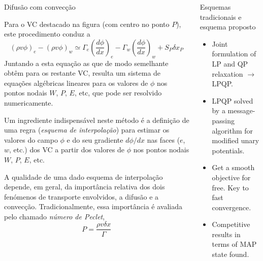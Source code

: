 \documentclass[final,t]{beamer}
\begin{document}
\begin{frame}{}
\begin{columns}[t]
\begin{column}{0.488\linewidth}
\begin{block}{Difusão com convecção}
{

        }
        Para o VC destacado na figura (com centro no ponto $P$),
        este procedimento conduz a
        \begin{equation*}
            (\rho v \phi)_e - (\rho v \phi)_w \simeq
            \Gamma_e\left(\frac{d\phi}{dx}\right)_e-
            \Gamma_w\left(\frac{d\phi}{dx}\right)_w + S_P\delta x_P
        \end{equation*}
        Juntando a esta equação as que de modo semelhante obtêm para os restante
        VC, resulta um sistema de equações algébricas lineares para os valores
        de $\phi$ nos pontos nodais $W$, $P$, $E$, etc, que pode ser resolvido
        numericamente.

        \vspace{5mm}
        Um ingrediente indispensável neste método é a definição de uma regra
        (\emph{esquema de interpolação}) para estimar os valores do campo $\phi$
        e do seu gradiente $d\phi/dx$ nas faces ($e$, $w$, etc.) dos VC a partir
        dos valores de $\phi$ nos pontos nodais $W$, $P$, $E$, etc.

        \vspace{5mm}
        A qualidade de uma dado esquema de interpolação depende, em geral, da
        importância relativa dos dois fenómenos de transporte envolvidos, a
        difusão e a convecção. Tradicionalmente, essa importância é avaliada
        pelo chamado \emph{número de Peclet},
        \begin{equation*}
            P=\frac{\rho v \delta x}{\Gamma}
        \end{equation*}
    \end{block}

\end{column}


\hfill
\begin{column}{.488\linewidth}
  
    \begin{block}{Esquemas tradicionais e esquema proposto}
        \begin{itemize}
            \item Joint formulation of LP and QP relaxation $\rightarrow$ LPQP.
            \item LPQP solved by a message-passing
            algorithm for modified unary potentials.
            \item Get a smooth objective for free. Key to fast convergence.
            \item Competitive results in terms of MAP state found.
        \end{itemize}
    \end{block}


\end{column}
\end{columns}
\end{frame}
\end{document}

